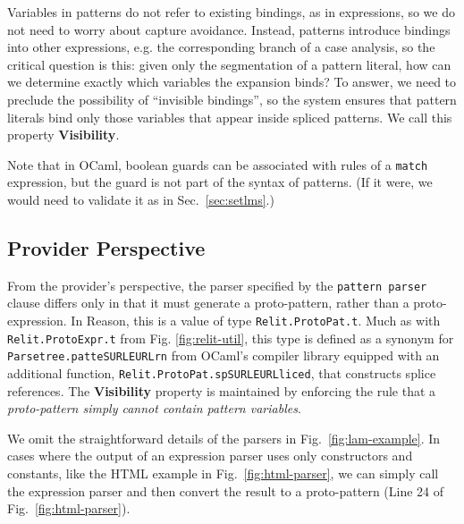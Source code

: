 \documentclass[acmsmall,screen]{acmart}
\newcommand{\li}[1]{\lstinline[basicstyle=\ttfamily\fontsize{9pt}{1em}\selectfont]{#1}}
\begin{document}
Variables in patterns do not refer to existing bindings, as in expressions, so we do not need to worry about capture avoidance. Instead, patterns introduce bindings into other expressions, e.g. the corresponding branch of a case analysis, so the critical question is this: given only the segmentation of a pattern literal, how can we determine exactly which variables the expansion binds? To answer, we need to preclude the possibility of ``invisible bindings'', so the system ensures that pattern literals bind only those variables that appear inside spliced patterns. We call this property \textbf{Visibility}. 

Note that in OCaml, boolean guards can be associated with rules of a \li{match} expression, but the guard is not part of the syntax of patterns. (If it were, we would need to validate it as in Sec.~\ref{sec:setlms}.) %

\subsection{Provider Perspective}
From the provider's perspective, the parser specified by the \li{pattern parser} clause differs only in that it must generate a proto-pattern, rather than a proto-expression. In Reason, this is a value of type \li{Relit.ProtoPat.t}. Much as with \li{Relit.ProtoExpr.t} from Fig. \ref{fig:relit-util}, this type is defined as a synonym for \li{Parsetree.patteSURLEURLrn} from OCaml's compiler library equipped with an additional function, \li{Relit.ProtoPat.spSURLEURLliced}, that constructs splice references. The \textbf{Visibility} property is maintained by enforcing the rule that a \emph{proto-pattern simply cannot contain pattern variables}.

We omit the straightforward details of the parsers in Fig.~\ref{fig:lam-example}. In cases where the output of an expression parser uses only constructors and constants, like the HTML example in Fig.~\ref{fig:html-parser}, we can simply call the expression parser and then convert the result to a proto-pattern (Line 24 of Fig.~\ref{fig:html-parser}). %
\end{document}
